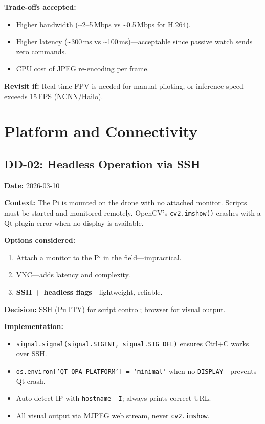 \documentclass[10pt,a4paper]{article}
\newcommand{\ddlabel}[1]{\textbf{\color{headblue}#1}\hspace{0.5em}}
\begin{document}
\ddlabel{Trade-offs accepted:}
\begin{itemize}
  \item Higher bandwidth (\textasciitilde2--5\,Mbps vs \textasciitilde0.5\,Mbps for H.264).
  \item Higher latency (\textasciitilde300\,ms vs \textasciitilde100\,ms)---acceptable since passive watch sends zero commands.
  \item CPU cost of JPEG re-encoding per frame.
\end{itemize}

\ddlabel{Revisit if:} Real-time FPV is needed for manual piloting, or inference speed exceeds 15\,FPS (NCNN/Hailo).

\section{Platform and Connectivity}

\subsection{DD-02: Headless Operation via SSH}
\label{sec:dd02}

\ddlabel{Date:} 2026-03-10

\ddlabel{Context:} The Pi is mounted on the drone with no attached monitor. Scripts must be started and monitored remotely. OpenCV's \texttt{cv2.imshow()} crashes with a Qt plugin error when no display is available.

\ddlabel{Options considered:}
\begin{enumerate}
  \item Attach a monitor to the Pi in the field---impractical.
  \item VNC---adds latency and complexity.
  \item \textbf{SSH + headless flags}---lightweight, reliable.
\end{enumerate}

\begin{decisionbox}
\textbf{Decision:} SSH (PuTTY) for script control; browser for visual output.
\end{decisionbox}

\ddlabel{Implementation:}
\begin{itemize}
  \item \texttt{signal.signal(signal.SIGINT, signal.SIG\_DFL)} ensures Ctrl+C works over SSH.
  \item \texttt{os.environ['QT\_QPA\_PLATFORM'] = 'minimal'} when no \texttt{DISPLAY}---prevents Qt crash.
  \item Auto-detect IP with \texttt{hostname -I}; always prints correct URL.
  \item All visual output via MJPEG web stream, never \texttt{cv2.imshow}.
\end{itemize}
\end{document}
